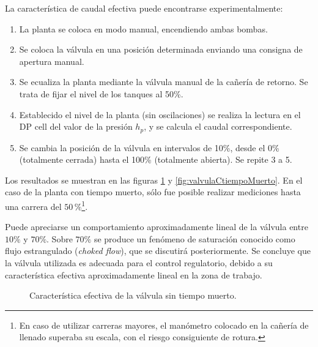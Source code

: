 La característica de caudal efectiva puede encontrarse experimentalmente:
\begin{enumerate}
 \item La planta se coloca en modo manual, encendiendo ambas bombas.
 \item Se coloca la válvula en una posición determinada enviando una consigna
de apertura manual.
 \item Se ecualiza la planta mediante la válvula manual de la cañería de
retorno. Se trata de fijar el nivel de los tanques al 50\%.
 \item Establecido el nivel de la planta (sin oscilaciones) se realiza la
lectura en el DP cell del valor de la presión $h_p$,
y se calcula el caudal correspondiente.
 \item Se cambia la posición de la válvula en intervalos de
 10\%, desde el 0\% (totalmente cerrada) hasta el 100\% (totalmente abierta).
Se repite 3 a 5.
\end{enumerate}

Los resultados se muestran en las figuras \ref{fig:valvulaStiempoMuerto} y
\ref{fig:valvulaCtiempoMuerto}.
En el caso de la planta con tiempo muerto, sólo fue posible realizar mediciones
hasta una carrera del $50\,\%$\footnote{En caso de utilizar carreras mayores,
el manómetro colocado en la cañería de llenado superaba su escala, con el
riesgo consiguiente de rotura.}.

Puede apreciarse un comportamiento aproximadamente lineal de la válvula entre
$10\%$ y $70\%$.
Sobre $70\%$  se produce un fenómeno de saturación conocido como flujo
estrangulado (\emph{choked flow}), que se discutirá posteriormente.
Se concluye que la válvula utilizada es adecuada para el
control regulatorio, debido a su característica efectiva aproximadamente lineal
en la zona de trabajo.

\begin{figure}[ht]
  \centering
\caption{Característica efectiva de la válvula sin tiempo muerto.}
\label{fig:valvulaStiempoMuerto}
\end{figure}


